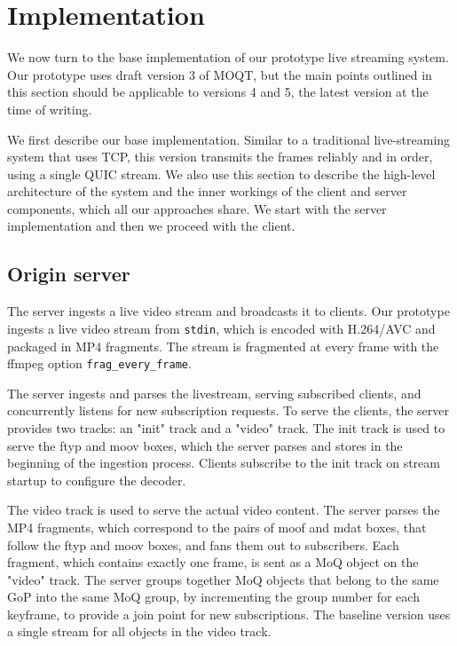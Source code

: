 
\chapter{Implementation}\label{chapter:implementation}

We now turn to the base implementation of our prototype live streaming system. Our prototype uses draft version 3 of \ac{MOQT}, but the main points outlined in this section should be applicable to versions 4 and 5, the latest version at the time of writing.

We first describe our base implementation. Similar to a traditional live-streaming system that uses TCP, this version transmits the frames reliably and in order, using a single QUIC stream. We also use this section to describe the high-level architecture of the system and the inner workings of the client and server components, which all our approaches share. We start with the server implementation and then we proceed with the client.

\section{Origin server}
The server ingests a live video stream and broadcasts it to clients. Our prototype ingests a live video stream from \lstinline{stdin}, which is encoded with H.264/AVC and packaged in MP4 fragments. The stream is fragmented at every frame with the ffmpeg option \lstinline{frag_every_frame}. %

The server ingests and parses the livestream, serving subscribed clients, and concurrently listens for new subscription requests. To serve the clients, the server provides two tracks: an "init" track and a "video" track. The init track is used to serve the ftyp and moov boxes, which the server parses and stores in the beginning of the ingestion process. Clients subscribe to the init track on stream startup to configure the decoder. %

The video track is used to serve the actual video content. The server parses the MP4 fragments, which correspond to the pairs of moof and mdat boxes, that follow the ftyp and moov boxes, and fans them out to subscribers. Each fragment, which contains exactly one frame, is sent as a MoQ object on the "video" track. The server groups together MoQ objects that belong to the same GoP into the same MoQ group, by incrementing the group number for each keyframe, to provide a join point for new subscriptions. The baseline version uses a single stream for all objects in the video track.

